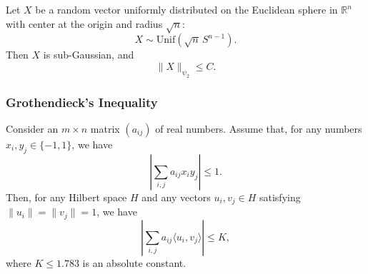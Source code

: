 \begin{thm}
Let $X$ be a random vector uniformly distributed on the Euclidean sphere in $\mathbb{R}^n$ with center at the origin and radius $\sqrt{n}$:
\[
X \sim \mathrm{Unif}\!\left(\sqrt{n}\, S^{n-1}\right).
\]
Then $X$ is sub-Gaussian, and
\[
\|X\|_{\psi_2} \leq C.
\]
\end{thm}

\subsubsection{Grothendieck’s Inequality}
\begin{thm}
Consider an $m \times n$ matrix $(a_{ij})$ of real numbers. Assume that, for any numbers $x_i, y_j \in \{-1, 1\}$, we have
\[
\left| \sum_{i, j} a_{ij} x_i y_j \right| \leq 1.
\]
Then, for any Hilbert space $H$ and any vectors $u_i, v_j \in H$ satisfying $\|u_i\| = \|v_j\| = 1$, we have
\[
\left| \sum_{i, j} a_{ij} \langle u_i, v_j \rangle \right| \leq K,
\]
where $K \leq 1.783$ is an absolute constant.
\end{thm}

